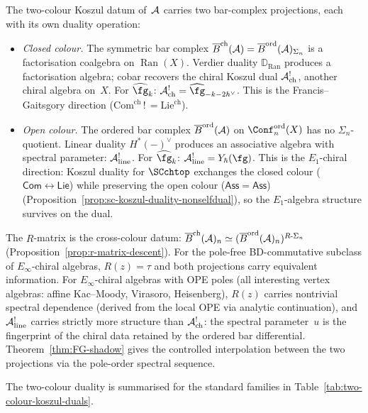 \begin{construction}
\begin{remark}%
\label{rem:two-colour-architecture}%
The two-colour Koszul datum of~$\mathcal{A}$
carries two bar-complex projections, each with its own
duality operation:
\begin{itemize}[nosep]
\item \emph{Closed colour.}
 The symmetric bar complex
 $\overline{B}^{\mathrm{ch}}(\mathcal{A}) = \overline{B}^{\mathrm{ord}}(\mathcal{A})_{\Sigma_n}$
 is a factorisation coalgebra on $\operatorname{Ran}(X)$.
 Verdier duality $\mathbb{D}_{\operatorname{Ran}}$
 produces a factorisation algebra; cobar recovers the
 chiral Koszul dual $\mathcal{A}^!_{\mathrm{ch}}$, another
 chiral algebra on~$X$. For $\widehat{\fg}_k$:
 $\cA^!_{\mathrm{ch}} = \widehat{\fg}_{-k-2h^\vee}$.
 This is the Francis--Gaitsgory direction
 ($\mathrm{Com}^{\mathrm{ch}}\,!\,=
 \mathrm{Lie}^{\mathrm{ch}}$).
\item \emph{Open colour.}
 The ordered bar complex
 $\overline{B}^{\mathrm{ord}}(\mathcal{A})$ on
 $\Conf_n^{\mathrm{ord}}(X)$ has no $\Sigma_n$-quotient.
 Linear duality $H^*(-)^\vee$ produces an associative
 algebra with spectral parameter:
 $\mathcal{A}^!_{\mathrm{line}}$. For $\widehat{\fg}_k$:
 $\cA^!_{\mathrm{line}} = Y_\hbar(\fg)$.
 This is the $E_1$-chiral direction: Koszul duality
 for $\SCchtop$ exchanges the closed colour
 ($\mathsf{Com} \leftrightarrow \mathsf{Lie}$) while
 preserving the open colour ($\mathsf{Ass} = \mathsf{Ass}$)
 (Proposition~\ref{prop:sc-koszul-duality-nonselfdual}), so the
 $E_1$-algebra structure survives on the dual.
\end{itemize}
The $R$-matrix is the cross-colour datum:
$\overline{B}^{\mathrm{ch}}(\mathcal{A})_n \simeq
(\overline{B}^{\mathrm{ord}}(\mathcal{A})_n)^{R\text{-}\Sigma_n}$
(Proposition~\ref{prop:r-matrix-descent}). For
the pole-free BD-commutative subclass of
$E_\infty$-chiral algebras, $R(z) = \tau$ and both
projections carry equivalent information. For
$E_\infty$-chiral algebras with OPE poles
(all interesting vertex algebras: affine Kac--Moody,
Virasoro, Heisenberg),
$R(z)$ carries nontrivial spectral dependence
(derived from the local OPE via analytic
continuation), and $\mathcal{A}^!_{\mathrm{line}}$ carries
strictly more structure than $\mathcal{A}^!_{\mathrm{ch}}$:
the spectral parameter~$u$ is the fingerprint of the
chiral data retained by the ordered bar differential.
Theorem~\ref{thm:FG-shadow} gives the controlled
interpolation between the two projections via the
pole-order spectral sequence.

The two-colour duality is summarised for the standard families
in Table~\ref{tab:two-colour-koszul-duals}.
\end{remark}


\end{construction}
